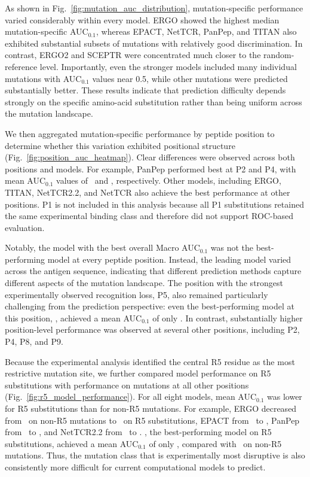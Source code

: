 \documentclass{article}
\begin{document}
As shown in Fig.~\ref{fig:mutation_auc_distribution}, mutation-specific
performance varied considerably within every model. ERGO showed the highest
median mutation-specific AUC$_{0.1}$, whereas EPACT, NetTCR, PanPep, and
TITAN also exhibited substantial subsets of mutations with relatively good
discrimination. In contrast, ERGO2 and SCEPTR were concentrated much
closer to the random-reference level. Importantly, even the stronger models
included many individual mutations with AUC$_{0.1}$ values near 0.5, while
other mutations were predicted substantially better. These results indicate
that prediction difficulty depends strongly on the specific amino-acid
substitution rather than being uniform across the mutation landscape.

We then aggregated mutation-specific performance by peptide position to
determine whether this variation exhibited positional structure
(Fig.~\ref{fig:position_auc_heatmap}). Clear differences were
observed across both positions and models. For example, PanPep performed best at P2 and
P4, with mean AUC$_{0.1}$ values of \valPosAucPanPepPtwo\ and \valPosAucPanPepPfour, respectively. Other models, including ERGO, TITAN, NetTCR2.2, and NetTCR also achieve the best performance at other positions. P1 is not included in this
analysis because all P1 substitutions retained the same experimental
binding class and therefore did not support ROC-based evaluation.

Notably, the model with the best overall Macro AUC$_{0.1}$ was not the
best-performing model at every peptide position. Instead, the leading model
varied across the antigen sequence, indicating that different prediction
methods capture different aspects of the mutation landscape. The position
with the strongest experimentally observed recognition loss, P5, also
remained particularly challenging from the prediction perspective: even the
best-performing model at this position, \valBestModelPfive, achieved a mean
AUC$_{0.1}$ of only \valPosAucTITANPfive. In contrast, substantially higher position-level
performance was observed at several other positions, including P2, P4, P8,
and P9.

Because the experimental analysis identified the central R5 residue as the
most restrictive mutation site, we further compared model performance on R5
substitutions with performance on mutations at all other positions
(Fig.~\ref{fig:r5_model_performance}). For all eight models,
mean AUC$_{0.1}$ was lower for R5 substitutions than for non-R5 mutations.
For example, ERGO decreased from \valNonRfiveAucERGO\ on non-R5 mutations to \valRfiveAucERGO\ on R5 substitutions, EPACT from \valNonRfiveAucEPACT\ to \valRfiveAucEPACT, PanPep from \valNonRfiveAucPanPep\ to \valRfiveAucPanPep, and NetTCR2.2 from \valNonRfiveAucNetTCRtwotwo\ to \valRfiveAucNetTCRtwotwo. 
\valBestModelRfive, the best-performing model on R5 substitutions, achieved a mean AUC$_{0.1}$ of only \valRfiveAucTITAN, compared with \valNonRfiveAucTITAN\ on non-R5 mutations. 
Thus, the mutation class that is
experimentally most disruptive is also consistently more difficult for
current computational models to predict.
\end{document}
